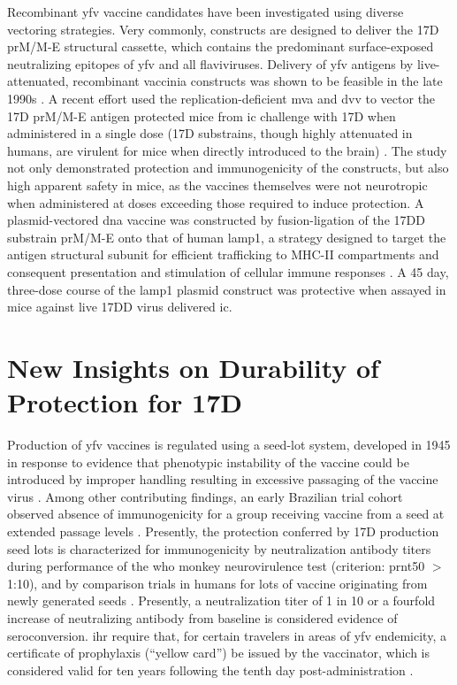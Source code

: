 Recombinant \gls{yfv} vaccine candidates have been investigated using diverse vectoring strategies. Very commonly, constructs are designed to deliver the 17D prM/M-E structural cassette, which contains the predominant surface-exposed neutralizing epitopes of \gls{yfv} and all flaviviruses. Delivery of \gls{yfv} antigens by live-attenuated, recombinant vaccinia constructs was shown to be feasible in the late 1990s \parencite{Pincus:1992ta}. A recent effort used the replication-deficient \gls{mva} and \gls{dvv} to vector the 17D prM/M-E antigen protected mice from \gls{ic} challenge with 17D when administered in a single dose (17D substrains, though highly attenuated in humans, are virulent for mice when directly introduced to the brain) \parencite{Schafer:2011hy}. The study not only demonstrated protection and immunogenicity of the constructs, but also high apparent safety in mice, as the vaccines themselves were not neurotropic when administered at doses exceeding those required to induce protection. A plasmid-vectored \gls{dna} vaccine was constructed by fusion-ligation of the 17DD substrain prM/M-E onto that of human \gls{lamp1}, a strategy designed to target the antigen structural subunit for efficient trafficking to MHC-II compartments and consequent presentation and stimulation of cellular immune responses \parencite{Maciel:2015dc}. A 45 day, three-dose course of the \gls{lamp1} plasmid construct was protective when assayed in mice against live 17DD virus delivered \gls{ic}.


\section{New Insights on Durability of Protection for 17D}
Production of \gls{yfv} vaccines is regulated using a seed-lot system, developed in 1945 in response to evidence that phenotypic instability of the vaccine could be introduced by improper handling resulting in excessive passaging of the vaccine virus \parencite{Quarantine:1945ui}. Among other contributing findings, an early Brazilian trial cohort observed absence of immunogenicity for a group receiving vaccine from a seed at extended passage levels \parencite{Soper:1938tb}. Presently, the protection conferred by 17D production seed lots is characterized for immunogenicity by neutralization antibody titers during performance of the \gls{who} monkey neurovirulence test (criterion: \gls{prnt50} $>$1:10), and by comparison trials in humans for lots of vaccine originating from newly generated seeds \parencite{WorldHealthOrganization:2010wo}. Presently, a neutralization titer of 1 in 10 or a fourfold increase of neutralizing antibody from baseline is considered evidence of seroconversion. \Gls{ihr} require that, for certain travelers in areas of \gls{yfv} endemicity, a certificate of prophylaxis (“yellow card”) be issued by the vaccinator, which is considered valid for ten years following the tenth day post-administration \parencite{Assembly:2006uc}.

